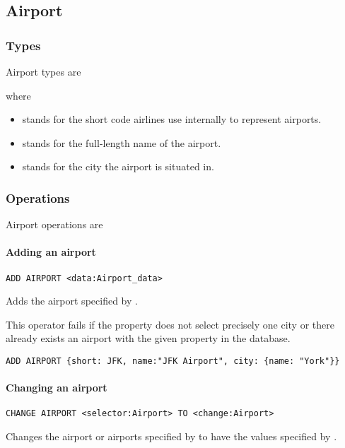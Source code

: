 \subsection{Airport}
\subsubsection{Types}
Airport types are
\begin{description}
  \item[] 
  \item[] 
\end{description}
where
\begin{itemize}
  \item {} stands for the short code airlines use internally to
    represent airports.
  \item {} stands for the full-length name of the airport.
  \item {} stands for the city the airport is situated in.
\end{itemize}
\subsubsection{Operations}
Airport operations are
\paragraph{Adding an airport}
\begin{operation}
  \lstinline{ADD AIRPORT <data:Airport_data>}
  \label{op:add_airport}
\end{operation}
Adds the airport specified by .

This operator fails if the  property does not select
precisely one city or there already exists an airport with the given
 property in the database.

\begin{texa}
  \lstinline|ADD AIRPORT {short: JFK, name:"JFK Airport", city: {name: "York"}}|
\end{texa}

\paragraph{Changing an airport}
\begin{operation}
  \lstinline{CHANGE AIRPORT <selector:Airport> TO <change:Airport>}
  \label{op:change_airport}
\end{operation}
Changes the airport or airports specified by  to have the values
specified by .

